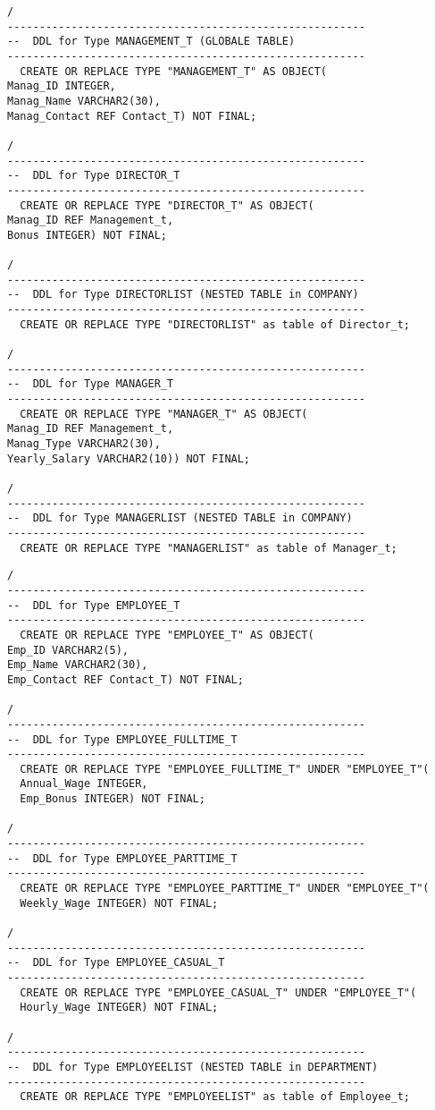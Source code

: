 \documentclass{scrartcl}
\begin{document}
\begin{lstlisting}
/
--------------------------------------------------------
--  DDL for Type MANAGEMENT_T (GLOBALE TABLE)
--------------------------------------------------------
  CREATE OR REPLACE TYPE "MANAGEMENT_T" AS OBJECT(
Manag_ID INTEGER,
Manag_Name VARCHAR2(30),
Manag_Contact REF Contact_T) NOT FINAL;

/
--------------------------------------------------------
--  DDL for Type DIRECTOR_T
--------------------------------------------------------
  CREATE OR REPLACE TYPE "DIRECTOR_T" AS OBJECT(
Manag_ID REF Management_t,
Bonus INTEGER) NOT FINAL;

/
--------------------------------------------------------
--  DDL for Type DIRECTORLIST (NESTED TABLE in COMPANY)
--------------------------------------------------------
  CREATE OR REPLACE TYPE "DIRECTORLIST" as table of Director_t;

/
--------------------------------------------------------
--  DDL for Type MANAGER_T
--------------------------------------------------------
  CREATE OR REPLACE TYPE "MANAGER_T" AS OBJECT(
Manag_ID REF Management_t, 
Manag_Type VARCHAR2(30),
Yearly_Salary VARCHAR2(10)) NOT FINAL;

/
--------------------------------------------------------
--  DDL for Type MANAGERLIST (NESTED TABLE in COMPANY)
--------------------------------------------------------
  CREATE OR REPLACE TYPE "MANAGERLIST" as table of Manager_t;
\end{lstlisting}

\begin{lstlisting}
/
--------------------------------------------------------
--  DDL for Type EMPLOYEE_T
--------------------------------------------------------
  CREATE OR REPLACE TYPE "EMPLOYEE_T" AS OBJECT(
Emp_ID VARCHAR2(5),
Emp_Name VARCHAR2(30),
Emp_Contact REF Contact_T) NOT FINAL;

/
--------------------------------------------------------
--  DDL for Type EMPLOYEE_FULLTIME_T
--------------------------------------------------------
  CREATE OR REPLACE TYPE "EMPLOYEE_FULLTIME_T" UNDER "EMPLOYEE_T"(
  Annual_Wage INTEGER,
  Emp_Bonus INTEGER) NOT FINAL;
  
/
--------------------------------------------------------
--  DDL for Type EMPLOYEE_PARTTIME_T
--------------------------------------------------------
  CREATE OR REPLACE TYPE "EMPLOYEE_PARTTIME_T" UNDER "EMPLOYEE_T"(
  Weekly_Wage INTEGER) NOT FINAL;
  
/
--------------------------------------------------------
--  DDL for Type EMPLOYEE_CASUAL_T
--------------------------------------------------------
  CREATE OR REPLACE TYPE "EMPLOYEE_CASUAL_T" UNDER "EMPLOYEE_T"(
  Hourly_Wage INTEGER) NOT FINAL;

/
--------------------------------------------------------
--  DDL for Type EMPLOYEELIST (NESTED TABLE in DEPARTMENT)
--------------------------------------------------------
  CREATE OR REPLACE TYPE "EMPLOYEELIST" as table of Employee_t;
\end{lstlisting}
\end{document}
